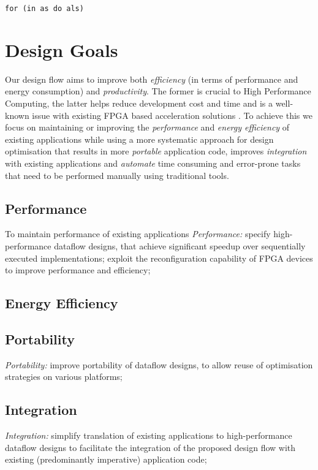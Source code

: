 \begin{lstlisting}
for (in as do als)
\end{lstlisting}

\section{Design Goals}

Our design flow aims to improve both \emph{efficiency} (in terms of
performance and energy consumption) and \emph{productivity}. The
former is crucial to High Performance Computing, the latter helps
reduce development cost and time and is a well-known issue with
existing FPGA based acceleration solutions . To achieve this we focus
on maintaining or improving the \emph{performance} and \emph{energy
  efficiency} of existing applications while using a more systematic
approach for design optimisation that results in more \emph{portable}
application code, improves \emph{integration} with existing
applications and \emph{automate} time consuming and error-prone tasks
that need to be performed manually using traditional tools.

\subsection{Performance}
To maintain performance of existing applications
\emph{Performance:} specify high-performance dataflow designs,
that achieve significant speedup over sequentially executed
implementations; exploit the reconfiguration capability of FPGA
devices to improve performance and efficiency;

\subsection{Energy Efficiency}

\subsection{Portability}
\emph{Portability:} improve portability of dataflow designs, to
allow reuse of optimisation strategies on various platforms;

\subsection{Integration}
\emph{Integration:} simplify translation of existing
applications to high-performance dataflow designs to facilitate the
integration of the proposed design flow with existing (predominantly
imperative) application code;

